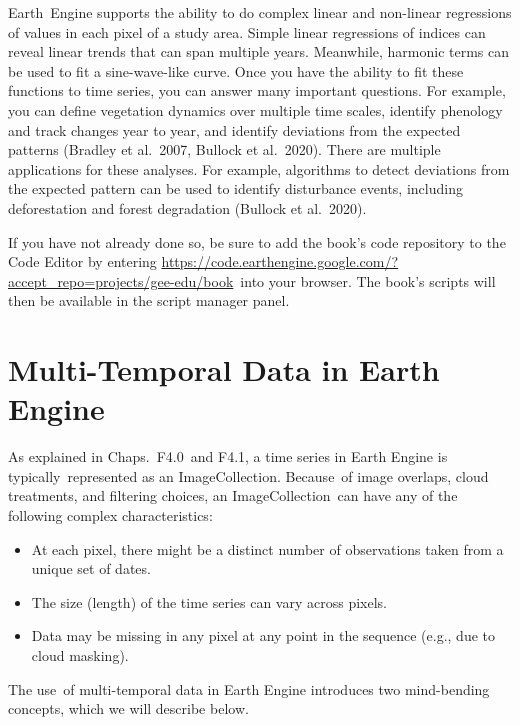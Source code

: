 \documentclass[
  letterpaper,
  DIV=11,
  numbers=noendperiod]{scrreprt}
\providecommand{\tightlist}{%
  \setlength{\itemsep}{0pt}\setlength{\parskip}{0pt}}\usepackage{longtable,booktabs,array}
\begin{document}
Earth~Engine supports the ability to do complex linear and non-linear
regressions of values in each pixel of a study area. Simple linear
regressions of indices can reveal linear trends that can span multiple
years. Meanwhile, harmonic terms can be used to fit a sine-wave-like
curve. Once you have the ability to fit these functions to time series,
you can answer many important questions. For example, you can define
vegetation dynamics over multiple time scales, identify phenology and
track changes year to year, and identify deviations from the expected
patterns (Bradley et al.~2007, Bullock et al.~2020). There are multiple
applications for these analyses. For example, algorithms to detect
deviations from the expected pattern can be used to identify disturbance
events, including deforestation and forest degradation (Bullock et
al.~2020).

If you have not already done so, be sure to add the book's code
repository to the Code Editor by entering
\href{https://www.google.com/url?q=https://code.earthengine.google.com/?accept_repo\%3Dprojects/gee-edu/book\&sa=D\&source=editors\&ust=1671458868327546\&usg=AOvVaw0m0oT1feMKQKRq3rtuOxfY}{https://code.earthengine.google.com/?accept\_repo=projects/gee-edu/book}~into
your browser. The book's scripts will then be available in the script
manager panel.

\hypertarget{multi-temporal-data-in-earth-engine}{%
\section{Multi-Temporal Data in Earth
Engine}\label{multi-temporal-data-in-earth-engine}}

As explained in Chaps.~F4.0~and F4.1, a time series in Earth Engine is
typically~represented as an ImageCollection. Because~of image overlaps,
cloud treatments, and filtering choices, an ImageCollection~can have any
of the following complex characteristics:

\begin{itemize}
\tightlist
\item
  At each pixel, there might be a distinct number of observations taken
  from a unique set of dates.
\item
  The size (length) of the time series can vary across pixels.
\item
  Data may be missing in any pixel at any point in the sequence (e.g.,
  due to cloud masking).
\end{itemize}

The use~of multi-temporal data in Earth Engine introduces two
mind-bending concepts, which we will describe below.
\end{document}
